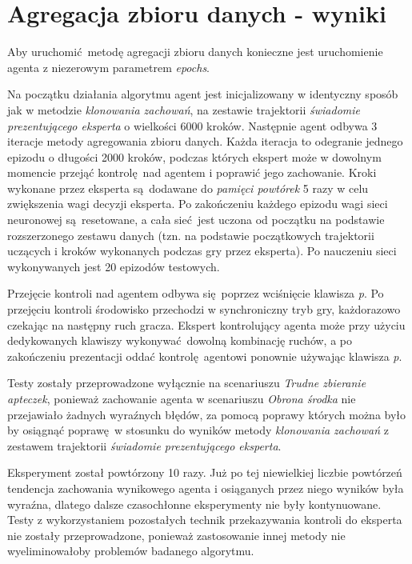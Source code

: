 \section{Agregacja zbioru danych - wyniki}

Aby uruchomić metodę agregacji zbioru danych konieczne jest uruchomienie agenta z niezerowym parametrem \textit{epochs}.

Na początku działania algorytmu agent jest inicjalizowany w identyczny sposób jak w metodzie \textit{klonowania zachowań}, na zestawie trajektorii \textit{świadomie prezentującego eksperta} o wielkości 6000 kroków. Następnie agent odbywa 3 iteracje metody agregowania zbioru danych. Każda iteracja to odegranie jednego epizodu o długości 2000 kroków, podczas których ekspert może w dowolnym momencie przejąć kontrolę nad agentem i poprawić jego zachowanie. Kroki wykonane przez eksperta są dodawane do \textit{pamięci powtórek} 5 razy w celu zwiększenia wagi decyzji eksperta. Po zakończeniu każdego epizodu wagi sieci neuronowej są resetowane, a cała sieć jest uczona od początku na podstawie rozszerzonego zestawu danych (tzn. na podstawie początkowych trajektorii uczących i kroków wykonanych podczas gry przez eksperta). Po nauczeniu sieci wykonywanych jest 20 epizodów testowych.

Przejęcie kontroli nad agentem odbywa się poprzez wciśnięcie klawisza \textit{p}. Po przejęciu kontroli środowisko przechodzi w synchroniczny tryb gry, każdorazowo czekając na następny ruch gracza. Ekspert kontrolujący agenta może przy użyciu dedykowanych klawiszy wykonywać dowolną kombinację ruchów, a po zakończeniu prezentacji oddać kontrolę agentowi ponownie używając klawisza \textit{p}.

Testy zostały przeprowadzone wyłącznie na scenariuszu \textit{Trudne zbieranie apteczek}, ponieważ zachowanie agenta w scenariuszu \textit{Obrona środka} nie przejawiało żadnych wyraźnych błędów, za pomocą poprawy których można było by osiągnąć poprawę w stosunku do wyników metody \textit{klonowania zachowań} z zestawem trajektorii \textit{świadomie prezentującego eksperta}.

Eksperyment został powtórzony 10 razy. Już po tej niewielkiej liczbie powtórzeń tendencja zachowania wynikowego agenta i osiąganych przez niego wyników była wyraźna, dlatego dalsze czasochłonne eksperymenty nie były kontynuowane. Testy z wykorzystaniem pozostałych technik przekazywania kontroli do eksperta nie zostały przeprowadzone, ponieważ zastosowanie innej metody nie wyeliminowałoby problemów badanego algorytmu.

